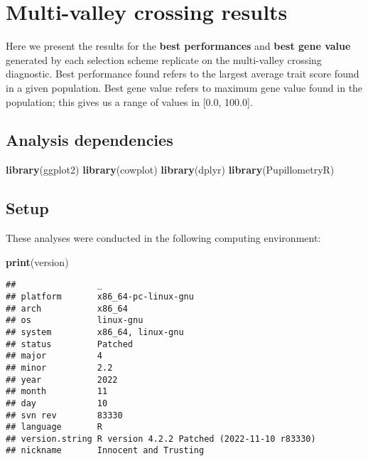 \documentclass[]{book}
\newenvironment{Shaded}{\begin{snugshade}}{\end{snugshade}}
\newcommand{\KeywordTok}[1]{\textcolor[rgb]{0.13,0.29,0.53}{\textbf{#1}}}
\newcommand{\NormalTok}[1]{#1}
\begin{document}
\hypertarget{multi-valley-crossing-results}{%
\chapter{Multi-valley crossing results}\label{multi-valley-crossing-results}}

Here we present the results for the \textbf{best performances} and \textbf{best gene value} generated by each selection scheme replicate on the multi-valley crossing diagnostic.
Best performance found refers to the largest average trait score found in a given population.
Best gene value refers to maximum gene value found in the population; this gives us a range of values in {[}0.0, 100.0{]}.

\hypertarget{analysis-dependencies-4}{%
\section{Analysis dependencies}\label{analysis-dependencies-4}}

\begin{Shaded}
\begin{Highlighting}[]
\KeywordTok{library}\NormalTok{(ggplot2)}
\KeywordTok{library}\NormalTok{(cowplot)}
\KeywordTok{library}\NormalTok{(dplyr)}
\KeywordTok{library}\NormalTok{(PupillometryR)}
\end{Highlighting}
\end{Shaded}

\hypertarget{setup-4}{%
\section{Setup}\label{setup-4}}

These analyses were conducted in the following computing environment:

\begin{Shaded}
\begin{Highlighting}[]
\KeywordTok{print}\NormalTok{(version)}
\end{Highlighting}
\end{Shaded}

\begin{verbatim}
##                _                                          
## platform       x86_64-pc-linux-gnu                        
## arch           x86_64                                     
## os             linux-gnu                                  
## system         x86_64, linux-gnu                          
## status         Patched                                    
## major          4                                          
## minor          2.2                                        
## year           2022                                       
## month          11                                         
## day            10                                         
## svn rev        83330                                      
## language       R                                          
## version.string R version 4.2.2 Patched (2022-11-10 r83330)
## nickname       Innocent and Trusting
\end{verbatim}
\end{document}
